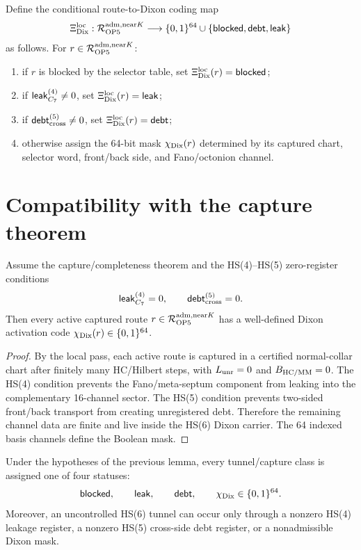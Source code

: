 \begin{definition}
Define the conditional route-to-Dixon coding map
\[
\Xi_{\mathrm{Dix}}^{\mathrm{loc}}:
\mathcal R_{\mathrm{OP} 5}^{\mathrm{adm},\mathrm{near} K}
\longrightarrow
\{0,1\}^{64}\cup\{\mathsf{blocked},\mathsf{debt},\mathsf{leak}\}
\]
as follows. For \(r\in\mathcal R_{\mathrm{OP} 5}^{\mathrm{adm},\mathrm{near} K}\):
\begin{enumerate}[label=(\alph*)]
\item if \(r\) is blocked by the selector table, set \(\Xi_{\mathrm{Dix}}^{\mathrm{loc}}(r)=\mathsf{blocked}\);
\item if \(\mathsf{leak}_{C_7}^{(4)}\ne0\), set \(\Xi_{\mathrm{Dix}}^{\mathrm{loc}}(r)=\mathsf{leak}\);
\item if \(\mathsf{debt}_{\mathrm{cross}}^{(5)}\ne0\), set \(\Xi_{\mathrm{Dix}}^{\mathrm{loc}}(r)=\mathsf{debt}\);
\item otherwise assign the 64-bit mask \(\chi_{\mathrm{Dix}}(r)\) determined by its captured chart, selector word, front/back side, and Fano/octonion channel.
\end{enumerate}
\end{definition}

\section{Compatibility with the capture theorem}

\begin{lemma}
Assume the capture/completeness theorem and the HS(4)--HS(5) zero-register conditions
\[
\mathsf{leak}_{C_7}^{(4)}=0,
\qquad
\mathsf{debt}_{\mathrm{cross}}^{(5)}=0.
\]
Then every active captured route \(r\in\mathcal R_{\mathrm{OP} 5}^{\mathrm{adm},\mathrm{near} K}\) has a well-defined Dixon activation code \(\chi_{\mathrm{Dix}}(r)\in\{0,1\}^{64}\).
\end{lemma}

\begin{proof}
By the local pass, each active route is captured in a certified normal-collar chart after finitely many HC/Hilbert steps, with \(L_{\mathrm{unr}}=0\) and \(B_{\mathrm{HC}/\mathrm{MM}}=0\). The HS(4) condition prevents the Fano/meta-septum component from leaking into the complementary 16-channel sector. The HS(5) condition prevents two-sided front/back transport from creating unregistered debt. Therefore the remaining channel data are finite and live inside the HS(6) Dixon carrier. The 64 indexed basis channels define the Boolean mask.
\end{proof}

\begin{proposition}
Under the hypotheses of the previous lemma, every tunnel/capture class is assigned one of four statuses:
\[
\mathsf{blocked},
\qquad
\mathsf{leak},
\qquad
\mathsf{debt},
\qquad
\chi_{\mathrm{Dix}}\in\{0,1\}^{64}.
\]
Moreover, an uncontrolled HS(6) tunnel can occur only through a nonzero HS(4) leakage register, a nonzero HS(5) cross-side debt register, or a nonadmissible Dixon mask.
\end{proposition}

